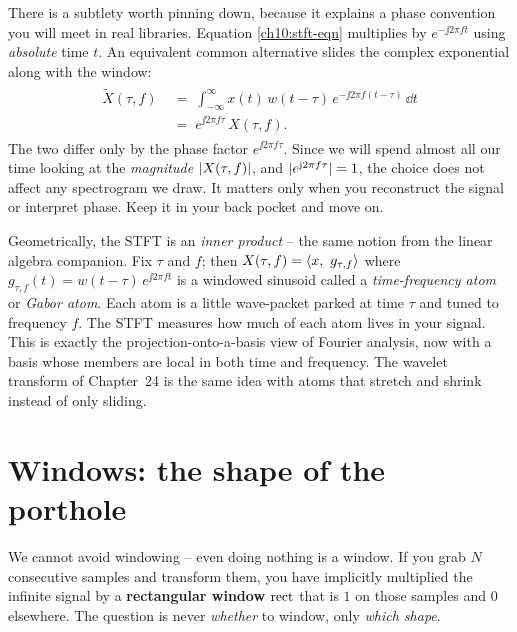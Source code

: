 There is a subtlety worth pinning down, because it explains a phase convention you
will meet in real libraries. Equation \eqref{ch10:stft-eqn} multiplies by
$e^{-\jj 2\pi f t}$ using \emph{absolute} time $t$. An equivalent common
alternative slides the complex exponential along with the window:
\begin{align}
\label{ch10:stft-shifted}
\begin{split}
\tilde X(\tau, f) \;&=\; \int_{-\infty}^{\infty} x(t)\, w(t-\tau)\, e^{-\jj 2\pi f (t-\tau)}\,\dd t \\
                 \;&=\; e^{\jj 2\pi f \tau}\, X(\tau, f).
\end{split}
\end{align}
The two differ only by the phase factor $e^{\jj 2\pi f \tau}$. Since we will spend
almost all our time looking at the \emph{magnitude} $\lvert X(\tau,f)\rvert$, and
$\lvert e^{\mathrm{j} 2\pi f \tau}\rvert = 1$, the choice does not affect any spectrogram we
draw. It matters only when you reconstruct the signal or interpret phase. Keep it
in your back pocket and move on.

\begin{connectionbox}
Geometrically, the STFT is an \emph{inner product} -- the same notion from the linear
algebra companion. Fix $\tau$ and $f$; then
$X(\tau,f) = \langle x,\, \,g_{\tau,f} \rangle$ where
$g_{\tau,f}(t) = w(t-\tau)\,e^{\jj 2\pi f t}$ is a windowed sinusoid called a
\emph{time-frequency atom} or \emph{Gabor atom}. Each atom is a little wave-packet
parked at time $\tau$ and tuned to frequency $f$. The STFT measures how much of
each atom lives in your signal. This is exactly the projection-onto-a-basis view
of Fourier analysis, now with a basis whose members are local in both time and
frequency. The wavelet transform of Chapter~24 is the same idea with atoms that
stretch and shrink instead of only sliding.
\end{connectionbox}

\section{Windows: the shape of the porthole}
\label{ch10:windows}

We cannot avoid windowing -- even doing nothing is a window. If you grab
$N$ consecutive samples and transform them, you have implicitly multiplied the
infinite signal by a \textbf{rectangular window} $\operatorname{rect}$ that is $1$ on those
samples and $0$ elsewhere. The question is never \emph{whether} to window, only
\emph{which shape}.

